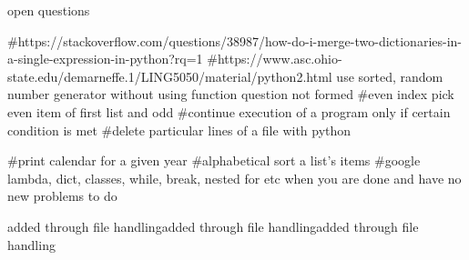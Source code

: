 open questions

#https://stackoverflow.com/questions/38987/how-do-i-merge-two-dictionaries-in-a-single-expression-in-python?rq=1
#https://www.asc.ohio-state.edu/demarneffe.1/LING5050/material/python2.html
use sorted, random number generator without using function
question not formed #even index pick even item of first list and odd 
#continue execution of a program only if certain condition is met
#delete particular lines of a file with python

#print calendar for a given year 
#alphabetical sort a list's items
#google lambda, dict, classes, while, break, nested for etc  when you are done and have no new problems to do


added through file handlingadded through file handlingadded through file handling
